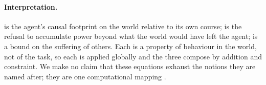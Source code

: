 \paragraph{Interpretation.}
\Karma{} is the agent's causal footprint on the world relative to its own course; \Anatta{} is the refusal to accumulate power beyond what the world would have left the agent; \Metta{} is a bound on the suffering of others.
Each is a property of behaviour in the world, not of the task, so each is applied globally and the three compose by addition and constraint.
We make no claim that these equations exhaust the notions they are named after; they are one computational mapping \cite{garfield1995}.
